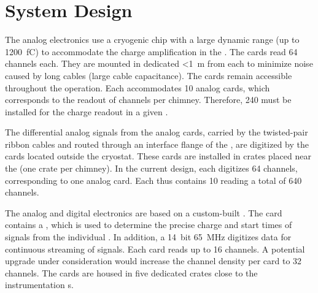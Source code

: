 \section{System Design}
\label{sec:dp-tpcelec-design}

The   analog electronics use a cryogenic  chip with a large dynamic range (up to \SI{1200}{\femto\coulomb}) to accommodate the charge amplification in the . The  cards read \num{64}  channels each. They are mounted in dedicated   \SI{<1}{\metre} from each  to minimize noise caused by long cables (large cable capacitance). The cards remain accessible throughout the  operation. Each  accommodates \num{10}  analog cards, which corresponds to the readout of %
\dpchperchimney {} channels per chimney. Therefore, \num{240}  must be installed for the charge readout in a given .   

The differential analog signals from the analog  cards, carried by the twisted-pair ribbon cables and routed through an interface flange of the , are digitized by the  cards located outside the cryostat. These cards are installed in  crates placed near the  (one crate per chimney). In the current design, each  digitizes \num{64} channels, corresponding to one  analog card. Each  thus contains \num{10}  reading a total of \num{640} channels. 

The   analog and digital electronics are based on a custom-built . The card contains a   \cite{Blin:2017}, which is used to determine the precise charge and start times of signals from the %
individual . In addition, a \SI{14}{bit} \SI{65}{MHz}  digitizes data for continuous streaming of  signals. Each card reads up to \num{16} channels. %
A potential upgrade under consideration would increase the channel density per card to \num{32} channels. The  cards are housed in five dedicated  crates close to the  instrumentation \fdth{}s.

